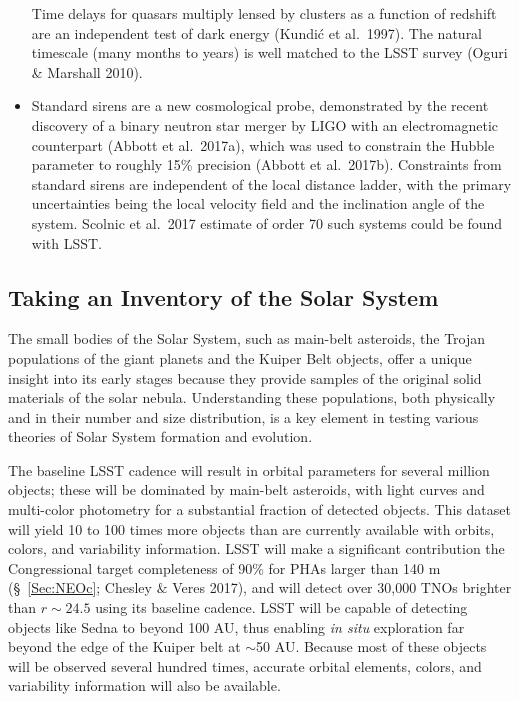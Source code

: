 \begin{itemize}
Time delays for quasars multiply lensed by clusters as a function of redshift are an independent test
of dark energy (Kundi\'{c} et al.~1997). The natural timescale (many months to years) is well matched
to the LSST survey (Oguri \& Marshall 2010).
\item Standard sirens are a new cosmological probe, demonstrated by the recent discovery of a binary
  neutron star merger by LIGO with an electromagnetic counterpart (Abbott et al.~2017a), which was
  used to constrain the Hubble parameter to roughly 15\% precision (Abbott et al.~2017b).
  Constraints from standard sirens are independent of the local distance ladder, with the primary
  uncertainties being the local velocity field and the inclination angle of the system.  Scolnic et
  al.~2017 estimate of order 70 such systems could be found with LSST.
\end{itemize}


\subsection{Taking an Inventory of the Solar System}



The small bodies of the Solar System, such as main-belt asteroids,
the Trojan populations of the giant planets and the Kuiper Belt objects,
offer a unique insight into its early stages because they provide
samples of the original solid materials of the solar nebula.
Understanding these populations, both physically and in their number
and size distribution, is a key element in testing various theories of
Solar System formation and evolution.

The baseline LSST cadence will result in orbital parameters for several
million objects; these will be dominated by main-belt asteroids, with
light curves and multi-color photometry for a substantial fraction of detected objects.
This dataset will yield 10 to 100 times more objects than are currently
available with orbits, colors, and variability information. LSST will make a significant contribution the Congressional target
completeness of 90\% for PHAs larger than 140 m (\S~\ref{Sec:NEOc}; Chesley $\&$ Veres 2017), and will detect over 30,000 TNOs brighter than $r\sim24.5$ using its baseline cadence. LSST will be capable
of detecting objects like Sedna to beyond 100 AU, thus enabling {\it in situ} exploration
far beyond the edge of the Kuiper belt at $\sim$50 AU. Because most of these
objects will be observed several hundred times, accurate orbital elements,
colors, and variability information will also be available.


